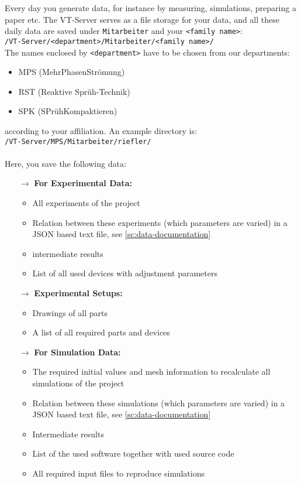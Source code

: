Every day you generate data, for instance by measuring, simulations, preparing a
paper etc. The VT-Server serves as a file storage for your data, and all these
daily data are saved under \texttt{Mitarbeiter} and your
\texttt{<family name>}: \\
\texttt{/VT-Server/<department>/Mitarbeiter/<family name>/} \\
The names enclosed by \texttt{<department>} have to be chosen from our
departments:
\begin{itemize}
  \item MPS (MehrPhasenStrömung)
  \item RST (Reaktive Sprüh-Technik)
  \item SPK (SPrühKompaktieren)
\end{itemize}
according to your affiliation. An example directory is: \\
\texttt{/VT-Server/MPS/Mitarbeiter/riefler/} \\
\\
Here, you save the following data:
\begin{itemize}
  \item[$\rightarrow$] \textbf{For Experimental Data:}
    \begin{itemize}
      \item All experiments of the project
      \item Relation between these experiments (which parameters are varied) in
            a JSON based text file, see \autoref{sc:data-documentation}
      \item intermediate results
      \item List of all used devices with adjustment parameters
    \end{itemize}
  \item[$\rightarrow$] \textbf{Experimental Setups:}
    \begin{itemize}
      \item Drawings of all parts
      \item A list of all required parts and devices
    \end{itemize}
  \item[$\rightarrow$] \textbf{For Simulation Data:}
    \begin{itemize}
      \item The required initial values and mesh information to recalculate all
            simulations of the project
      \item Relation between these simulations (which parameters are varied) in
            a JSON based text file, see \autoref{sc:data-documentation}
      \item Intermediate results
      \item List of the used software together with used source code
      \item All required input files to reproduce simulations
    \end{itemize}
\end{itemize}

